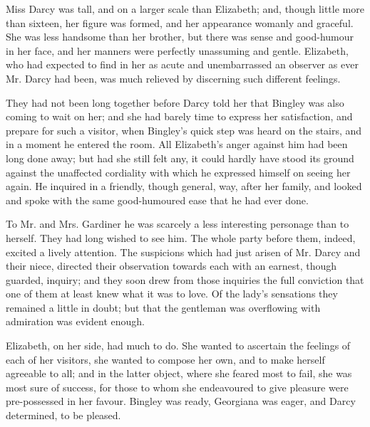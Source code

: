 \documentclass[10pt]{book}
\begin{document}
   Miss Darcy was tall, and on a larger scale than Elizabeth; and, though
little more than sixteen, her figure was formed, and her appearance
womanly and graceful. She was less handsome than her brother, but
   there
was sense and good-humour in her face, and her manners were perfectly
unassuming and gentle. Elizabeth, who had expected to find in her as
acute and unembarrassed an observer as ever Mr. Darcy had been, was much
relieved by discerning such different feelings.
  

   They had not been long together before Darcy told her that Bingley was
also coming to wait on her; and she had barely time to express her
satisfaction, and prepare for such a visitor, when Bingley’s quick step
was heard on the stairs, and in a moment he entered the room. All
Elizabeth’s anger against him had been long done away; but had she still
felt any, it could hardly have stood its ground against the unaffected
cordiality with which he expressed himself on seeing her again. He
inquired in a friendly, though general, way, after her family, and
looked and spoke with the same good-humoured ease that he had ever done.
  

   To Mr. and Mrs. Gardiner he was scarcely a less interesting personage
than to herself. They had long wished to see him. The whole party before
them, indeed, excited a lively attention. The suspicions which had just
arisen of Mr. Darcy and their niece, directed their observation towards
each with an earnest, though guarded, inquiry; and they soon drew from
those inquiries the full conviction that one of them at least knew what
it was to love. Of the lady’s sensations they remained a little in
doubt; but that the gentleman was overflowing with admiration was
evident enough.
  

   Elizabeth, on her side, had much to do. She wanted to ascertain the
feelings of each of her visitors, she wanted to compose her own, and to
make herself agreeable to all; and in the latter object, where she
feared most to fail, she was most sure of success, for those to
   whom
she endeavoured to give pleasure were pre-possessed in her favour.
Bingley was ready, Georgiana was eager, and Darcy determined, to be
pleased.
  
\end{document}
